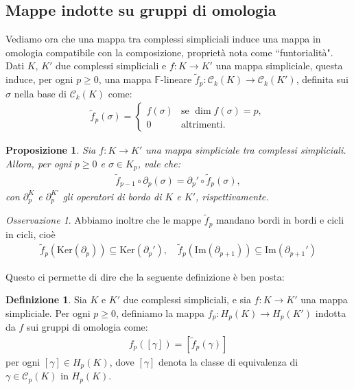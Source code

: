\documentclass[a4paper, 12pt]{article}
\newtheorem{proposition}[theorem]{Proposizione}
\theoremstyle{definition}
\newtheorem{definition}{Definizione}[section]
\theoremstyle{remark}
\newtheorem{remark}[theorem]{Osservazione}
\begin{document}
\subsection{Mappe indotte su gruppi di omologia}
Vediamo ora che una mappa tra complessi simpliciali induce una mappa in omologia compatibile con la composizione, proprietà nota come ``funtorialità".
Dati $K$, $K'$ due complessi simpliciali e $f : K \to K'$ una mappa simpliciale, questa induce, per ogni $p \geq 0$, una mappa $\mathbb{F}$-lineare $\widetilde{f}_p: \mathcal{C}_k(K) \to \mathcal{C}_k(K')$, definita sui $\sigma$ nella base di $\mathcal{C}_k(K)$ come:
\begin{align*}
    \widetilde{f}_p(\sigma) =
    \begin{cases}
        f(\sigma) & \text{se } \dim f(\sigma) = p,\\
        0 & \text{altrimenti.}
    \end{cases}
\end{align*}

\begin{proposition} \label{prop:bordo-mappa}
    Sia $f : K \to K'$ una mappa simpliciale tra complessi simpliciali. Allora, per ogni $p \geq 0$ e $\sigma \in K_p$, vale che:
    \begin{align*}
        \widetilde{f}_{p-1} \circ \partial_p (\sigma) = \partial_p' \circ \widetilde{f}_p(\sigma),
    \end{align*}
    con $\partial_p^K$ e $\partial_p^{K'}$ gli operatori di bordo di $K$ e $K'$, rispettivamente.
\end{proposition}

\begin{remark}
    Abbiamo inoltre che le mappe $\widetilde{f}_p$ mandano bordi in bordi e cicli in cicli, cioè
    \begin{align*}
        \widetilde{f}_p(\text{Ker} (\partial_p)) \subseteq \text{Ker} (\partial_p') , \quad \widetilde{f}_p(\text{Im}(\partial_{p+1})) \subseteq \text{Im}(\partial_{p+1}') 
    \end{align*}
    
\end{remark}

Questo ci permette di dire che la seguente definizione è ben posta:
\begin{definition}
    Sia $K$ e $K'$ due complessi simpliciali, e sia $f : K \to K'$ una mappa simpliciale. Per ogni $p \geq 0$, definiamo la mappa $f_p : H_p(K) \to H_p(K')$ indotta da $f$ sui gruppi di omologia come:
    \begin{align*}
        f_p([\gamma]) = [\widetilde{f}_p(\gamma)]    
    \end{align*}
    per ogni $[\gamma] \in H_p(K)$, dove $[\gamma]$ denota la classe di equivalenza di $\gamma \in \mathcal{C}_p(K)$ in $H_p(K)$.
\end{definition}
\end{document}
